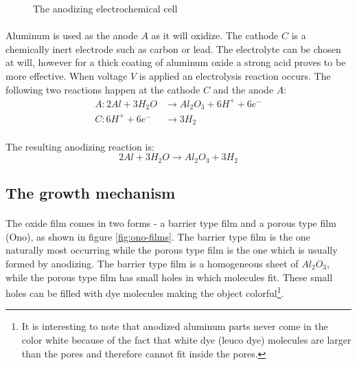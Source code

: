 \documentclass[a4paper]{article}
\begin{document}
\begin{figure}[ht]
  \centering
  \caption{The anodizing electrochemical cell}
  \label{fig:ec-cell}
\end{figure}

\paragraph*{}
Aluminum is used as the anode $A$ as it will oxidize. The cathode $C$ is a
chemically inert electrode such as carbon or lead. The electrolyte can be
chosen at will, however for a thick coating of aluminum oxide a strong acid
proves to be more effective. When voltage $V$ is applied an electrolysis
reaction occurs. The following two reactions happen at the cathode $C$ and the
anode $A$:
\begin{align*}
  A: 2Al + 3H_2O &\rightarrow Al_2O_3 + 6H^+ + 6e^- \\
  C: 6H^+ + 6e^- &\rightarrow 3H_2
\end{align*}

\paragraph*{}
The resulting anodizing reaction is:
$$2Al + 3H_2O \rightarrow Al_2O_3 + 3H_2$$

\subsection{The growth mechanism}

\paragraph*{}
The oxide film comes in two forms - a barrier type film and a porous type film
(Ono), as shown in figure \ref{fig:ono-films}. The barrier type film is the one
naturally most occurring while the porous type film is the one which is usually
formed by anodizing. The barrier type film is a homogeneous sheet of $Al_2O_3$,
while the porous type film has small holes in which molecules fit. These small
holes can be filled with dye molecules making the object colorful\footnote{It
is interesting to note that anodized aluminum parts never come in the color
white because of the fact that white dye (leuco dye) molecules are larger than
the pores and therefore cannot fit inside the pores.}.
\end{document}
